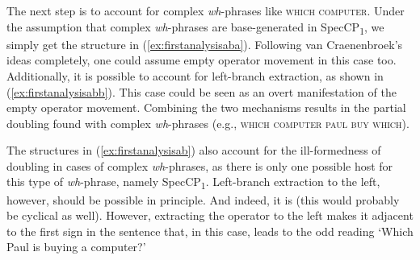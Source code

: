 \noindent The next step is to account for complex \textit{wh}-phrases like \textsc{which computer}. Under the assumption that complex \textit{wh}-phrases are base-generated in SpecCP\textsubscript{1}, we simply get the structure in (\ref{ex:firstanalysisaba}). Following van Craenenbroek's ideas completely, one could assume empty operator movement in this case too. Additionally, it is possible to account for left-branch extraction, as shown in (\ref{ex:firstanalysisabb}). This case could be seen as an overt manifestation of the empty operator movement. Combining the two mechanisms results in the partial doubling found with complex \textit{wh}-phrases (e.g., \textsc{which computer paul buy which}). %

The structures in (\ref{ex:firstanalysisab}) also account for the ill-formedness of doubling in cases of complex \textit{wh}-phrases, as there is only one possible host for this type of \textit{wh}-phrase, namely SpecCP\textsubscript{1}. Left-branch extraction to the left, however, should be possible in principle. And indeed, it is (this would probably be cyclical as well). However, extracting the operator to the left makes it adjacent to the first sign in the sentence that, in this case, leads to the odd reading `Which Paul is buying a computer?' 


